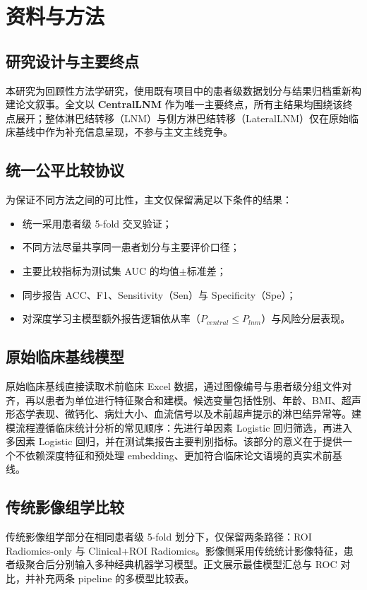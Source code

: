 \section{资料与方法}

\subsection{研究设计与主要终点}
本研究为回顾性方法学研究，使用既有项目中的患者级数据划分与结果归档重新构建论文叙事。全文以 \textbf{CentralLNM} 作为唯一主要终点，所有主结果均围绕该终点展开；整体淋巴结转移（LNM）与侧方淋巴结转移（LateralLNM）仅在原始临床基线中作为补充信息呈现，不参与主文主线竞争。

\subsection{统一公平比较协议}
为保证不同方法之间的可比性，主文仅保留满足以下条件的结果：
\begin{itemize}[leftmargin=1.8em]
  \item 统一采用患者级 5-fold 交叉验证；
  \item 不同方法尽量共享同一患者划分与主要评价口径；
  \item 主要比较指标为测试集 AUC 的均值$\pm$标准差；
  \item 同步报告 ACC、F1、Sensitivity（Sen）与 Specificity（Spe）；
  \item 对深度学习主模型额外报告逻辑依从率（$P_{central}\le P_{lnm}$）与风险分层表现。
\end{itemize}

\subsection{原始临床基线模型}
原始临床基线直接读取术前临床 Excel 数据，通过图像编号与患者级分组文件对齐，再以患者为单位进行特征聚合和建模。候选变量包括性别、年龄、BMI、超声形态学表现、微钙化、病灶大小、血流信号以及术前超声提示的淋巴结异常等。建模流程遵循临床统计分析的常见顺序：先进行单因素 Logistic 回归筛选，再进入多因素 Logistic 回归，并在测试集报告主要判别指标。该部分的意义在于提供一个不依赖深度特征和预处理 embedding、更加符合临床论文语境的真实术前基线。

\subsection{传统影像组学比较}
传统影像组学部分在相同患者级 5-fold 划分下，仅保留两条路径：ROI Radiomics-only 与 Clinical+ROI Radiomics。影像侧采用传统统计影像特征，患者级聚合后分别输入多种经典机器学习模型。正文展示最佳模型汇总与 ROC 对比，并补充两条 pipeline 的多模型比较表。

